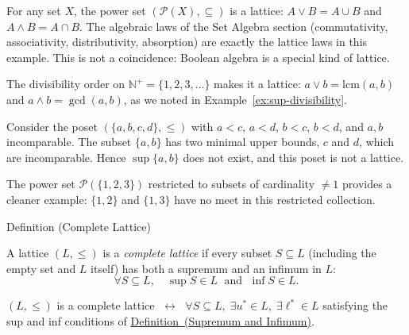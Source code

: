 \begin{example*}
\label{ex:power-set-lattice}
For any set $X$, the power set $(\mathcal{P}(X), \subseteq)$ is a lattice:
$A \vee B = A \cup B$ and $A \wedge B = A \cap B$.  The algebraic laws
of the Set Algebra section (commutativity, associativity, distributivity,
absorption) are exactly the lattice laws in this example.  This is not a
coincidence: Boolean algebra is a special kind of lattice.
\end{example*}

\begin{example*}
\label{ex:div-lattice}
The divisibility order on $\mathbb{N}^+ = \{1, 2, 3, \ldots\}$ makes it a
lattice: $a \vee b = \mathrm{lcm}(a,b)$ and $a \wedge b = \gcd(a,b)$, as
we noted in Example~\ref{ex:sup-divisibility}.
\end{example*}

\begin{example*}
\label{ex:non-lattice}
Consider the poset $(\{a,b,c,d\}, \leq)$ with $a < c$, $a < d$, $b < c$,
$b < d$, and $a,b$ incomparable.  The subset $\{a,b\}$ has two minimal
upper bounds, $c$ and $d$, which are incomparable.  Hence $\sup\{a,b\}$
does not exist, and this poset is not a lattice.

The power set $\mathcal{P}(\{1,2,3\})$ restricted to subsets of cardinality
$\neq 1$ provides a cleaner example: $\{1,2\}$ and $\{1,3\}$ have no meet in
this restricted collection.
\end{example*}


\begin{definitionbox}{Definition (Complete Lattice)}
\begin{definition}\label{def:complete-lattice}
A lattice $(L, \leq)$ is a \emph{complete lattice} if every subset
$S \subseteq L$ (including the empty set and $L$ itself) has both a
supremum and an infimum in $L$:
\[
  \forall S \subseteq L,\quad \sup S \in L \;\text{ and }\; \inf S \in L.
\]
\end{definition}
\end{definitionbox}

\begin{remark*}
$(L, \leq)$ is a complete lattice $\;\leftrightarrow\;$
$\forall S \subseteq L,\;\exists u^* \in L,\;\exists \ell^* \in L$ satisfying
the sup and inf conditions of \hyperref[def:sup-inf]{Definition~(Supremum and Infimum)}.
\end{remark*}


